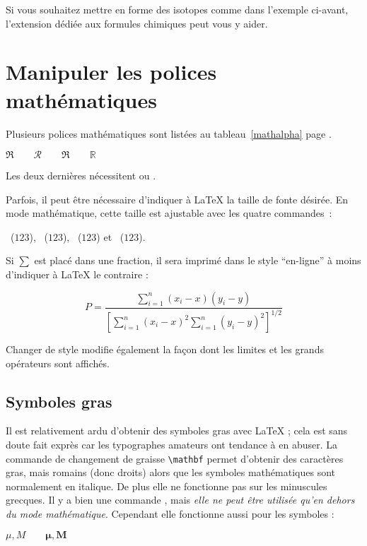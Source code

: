 Si vous souhaitez mettre en forme des isotopes comme dans l'exemple
ci-avant, l'extension  dédiée aux formules chimiques peut
vous y aider.


\section{Manipuler les polices mathématiques}\label{sec:fontsz}
Plusieurs polices mathématiques sont listées au tableau~\ref{mathalpha}
page \pageref{mathalpha}.
\begin{example}
 $\Re \qquad
  \mathcal{R} \qquad
  \mathfrak{R} \qquad
  \mathbb{R} \qquad $
\end{example}
Les deux dernières nécessitent  ou .

Parfois, il peut être nécessaire d'indiquer à \LaTeX{} la taille
de fonte désirée. En mode mathématique, cette taille est ajustable
avec les quatre commandes~:
\begin{flushleft}
~($\displaystyle 123$),
 ~($\textstyle 123$),
~($\scriptstyle 123$) et
~($\scriptscriptstyle 123$).
\end{flushleft}

Si $\sum$ est placé dans une fraction, il sera imprimé dans le style
\enquote{en-ligne} à
moins d'indiquer à \LaTeX{} le contraire :
\begin{example}
\begin{equation*}
 P = \frac{\displaystyle{
   \sum_{i=1}^n (x_i-x)
   (y_i-y)}}
   {\displaystyle{\left[
   \sum_{i=1}^n(x_i-x)^2
   \sum_{i=1}^n(y_i-y)^2
   \right]^{1/2}}}
\end{equation*}
\end{example}

Changer de style modifie également la façon dont les limites et les
grands opérateurs sont affichés.



\subsection{Symboles gras}

Il est relativement ardu d'obtenir des symboles gras avec \LaTeX{} ;
cela est sans doute fait exprès car les typographes amateurs ont
tendance à en abuser. La commande de changement de graisse
\verb|\mathbf| permet d'obtenir des caractères gras, mais romains
(donc droits) alors que les symboles mathématiques sont normalement en
italique. De plus elle ne fonctionne pas sur les minuscules
grecques. Il y a bien une commande , mais \emph{elle ne
  peut être utilisée qu'en dehors du mode mathématique}. Cependant
elle fonctionne aussi pour les symboles :
\begin{example}
$\mu, M \qquad
\mathbf{\mu}, \mathbf{M}$
\qquad {}
\end{example}

